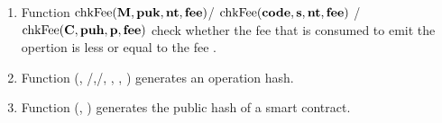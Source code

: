 \documentclass[a4paper]{llncs}
\begin{document}
\begin{enumerate}
    \item Function  $\textup{chkFee} (\textbf{M}, \textbf{puk},\textbf{nt}, \textbf{fee})$/ $\textup{chkFee} (\textbf{code}, \textbf{s}, \textbf{nt}, \textbf{fee})$ / $\textup{chkFee} (\textbf{C}, \textbf{puh}, \textbf{p}, \textbf{fee})$ check whether the fee that is consumed to emit the opertion is less or equal to the fee \MTEZ. 
    \item Function \GENERATEOPH (\PUK, {\ADDR /\CODE},{\INIT /\PARAMETER}, \NTEZ, \MTEZ,  \TIME) generates an operation hash.

    \item Function \GENERATEHASH (\CODE, \TIME)  generates the public hash of a smart contract.
    \end{enumerate}


    
\end{document}
